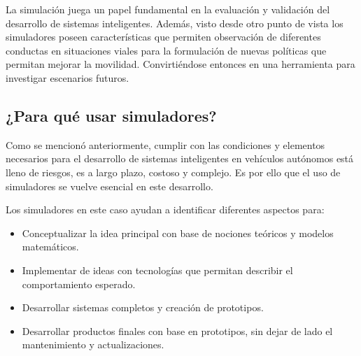 La simulación juega un papel fundamental en la evaluación y validación del desarrollo de sistemas inteligentes. Además, visto desde otro punto de vista los simuladores poseen características que permiten observación de diferentes conductas en situaciones viales para la formulación de nuevas políticas que permitan mejorar la movilidad. Convirtiéndose entonces en una herramienta para investigar escenarios futuros\cite{eskandarian2012handbook}.

\subsection{¿Para qué usar simuladores?} \label{sub:para_qué_usar_simuladores}

Como se mencionó anteriormente, cumplir con las condiciones y elementos necesarios para el desarrollo de sistemas inteligentes en vehículos autónomos está lleno de riesgos, es a largo plazo, costoso y complejo. Es por ello que el uso de simuladores se vuelve esencial en este desarrollo. 

Los simuladores en este caso ayudan a identificar diferentes aspectos para:
\begin{itemize}
    \item Conceptualizar la idea principal con base de nociones teóricos y modelos matemáticos.
    \item Implementar de ideas con tecnologías que permitan describir el comportamiento esperado.
    \item Desarrollar sistemas completos y creación de prototipos.
    \item Desarrollar productos finales con base en prototipos, sin dejar de lado el mantenimiento y actualizaciones.
\end{itemize}


